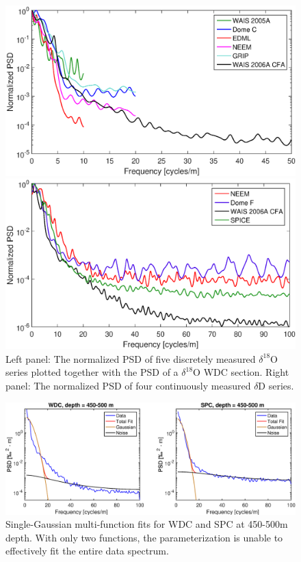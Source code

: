\documentclass[draft, jgrga]{AGUTeX}
\begin{document}
\begin{figure}[]
	\centering
	\begin{minipage}{.5\textwidth}
		\centering
		\includegraphics[width=0.9\linewidth]{PSD_discrete_plus_cfa_v1.eps}

	\end{minipage}%
	\begin{minipage}{0.5\textwidth}
		\centering
		\indent\includegraphics[width=0.9\linewidth]{PSD_CFA_v1.eps}

	\end{minipage}
	\caption{Left panel: The normalized PSD of five discretely measured $\delta^{18}$O series plotted together with the PSD of a $\delta^{18}$O WDC section. Right panel: The normalized PSD of four continuously measured $\delta$D series.}
\label{spectra_disVScfa}
\end{figure}

\begin{figure}
	\includegraphics[width=\linewidth]{GR_fits.eps}
	\caption{Single-Gaussian multi-function fits for WDC and SPC at 450-500m depth. With only two functions, the parameterization is unable to effectively fit the entire data spectrum.} \label{GR_fits}
\end{figure}
\end{document}
